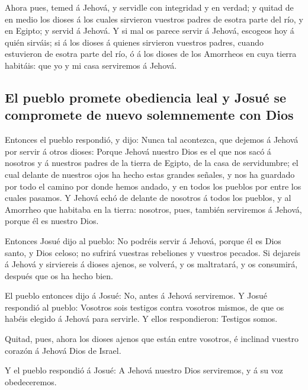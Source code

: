  Ahora pues, temed á Jehová, y servidle con integridad y
en verdad; y quitad de en medio los dioses á los cuales sirvieron
vuestros padres de esotra parte del río, y en Egipto; y servid á Jehová.
 Y si mal os parece servir á Jehová, escogeos hoy á quién
sirváis; si á los dioses á quienes sirvieron vuestros padres, cuando
estuvieron de esotra parte del río, ó á los dioses de los Amorrheos en
cuya tierra habitáis: que yo y mi casa serviremos á Jehová.

\hypertarget{el-pueblo-promete-obediencia-leal-y-josuuxe9-se-compromete-de-nuevo-solemnemente-con-dios}{%
\subsection{El pueblo promete obediencia leal y Josué se compromete de
nuevo solemnemente con
Dios}\label{el-pueblo-promete-obediencia-leal-y-josuuxe9-se-compromete-de-nuevo-solemnemente-con-dios}}

 Entonces el pueblo respondió, y dijo: Nunca tal
acontezca, que dejemos á Jehová por servir á otros dioses:
 Porque Jehová nuestro Dios es el que nos sacó á nosotros
y á nuestros padres de la tierra de Egipto, de la casa de servidumbre;
el cual delante de nuestros ojos ha hecho estas grandes señales, y nos
ha guardado por todo el camino por donde hemos andado, y en todos los
pueblos por entre los cuales pasamos.  Y Jehová echó de
delante de nosotros á todos los pueblos, y al Amorrheo que habitaba en
la tierra: nosotros, pues, también serviremos á Jehová, porque él es
nuestro Dios.

 Entonces Josué dijo al pueblo: No podréis servir á
Jehová, porque él es Dios santo, y Dios celoso; no sufrirá vuestras
rebeliones y vuestros pecados.  Si dejareis á Jehová y
sirviereis á dioses ajenos, se volverá, y os maltratará, y os consumirá,
después que os ha hecho bien.

 El pueblo entonces dijo á Josué: No, antes á Jehová
serviremos.  Y Josué respondió al pueblo: Vosotros sois
testigos contra vosotros mismos, de que os habéis elegido á Jehová para
servirle. Y ellos respondieron: Testigos somos.

 Quitad, pues, ahora los dioses ajenos que están entre
vosotros, é inclinad vuestro corazón á Jehová Dios de Israel.

 Y el pueblo respondió á Josué: A Jehová nuestro Dios
serviremos, y á su voz obedeceremos.

